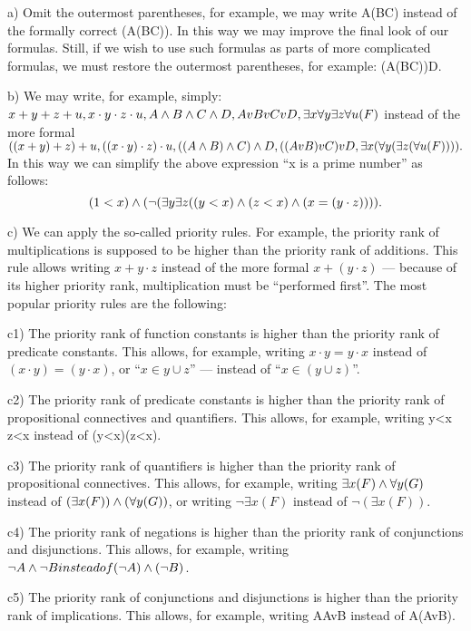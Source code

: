a) Omit the outermost parentheses, for example, we may write A\IMPLIES (B\IMPLIES C) instead of the formally correct (A\IMPLIES (B\IMPLIES C)). In this way we may improve the final look of our formulas. Still, if we wish to use such formulas as parts of more complicated formulas, we must restore the outermost parentheses, for example: (A\IMPLIES (B\IMPLIES C))\IMPLIES D.

b) We may write, for example, simply: \(x+y+z+u, x\cdot y\cdot z\cdot u, A\wedge B\wedge C\wedge D, AvBvCvD, \exists x\forall y\exists z\forall u(F)\) instead of the more formal \(((x+y)+z)+u, ((x\cdot y)\cdot z)\cdot u, ((A\wedge B)\wedge C)\wedge D, ((AvB)vC)vD, \exists x(\forall y(\exists z(\forall u(F)))).\) In this way we can simplify the above expression ``x is a prime number'' as follows:
\[
(1<x)\wedge (\neg (\exists y\exists z((y<x)\wedge (z<x)\wedge (x=(y\cdot z)))).
\]

c) We can apply the so-called priority rules. For example, the priority rank of multiplications is supposed to be higher than the priority rank of additions. This rule allows writing \(x+y\cdot z\) instead of the more formal \(x+(y\cdot z)\) --- because of its higher priority rank, multiplication must be ``performed first''. The most popular priority rules are the following:

c1) The priority rank of function constants is higher than the priority rank of predicate constants. This allows, for example, writing \(x\cdot y = y\cdot x\) instead of \((x\cdot y)=(y\cdot x)\), or ``\(x\in y\cup z\)'' --- instead of ``\(x\in (y\cup z)\)''.

c2) The priority rank of predicate constants is higher than the priority rank of propositional connectives and quantifiers. This allows, for example, writing y<x \AND  z<x instead of (y<x)\AND (z<x).

c3) The priority rank of quantifiers is higher than the priority rank of propositional connectives. This allows, for example, writing \(\exists x(F)\wedge \forall y(G)\) instead of \((\exists x(F))\wedge (\forall y(G))\), or writing \(\neg \exists x(F)\) instead of \(\neg (\exists x(F))\).

c4) The priority rank of negations is higher than the priority rank of conjunctions and disjunctions. This allows, for example, writing \(\neg A\wedge \neg B instead of (\neg A)\wedge (\neg B)\).

c5) The priority rank of conjunctions and disjunctions is higher than the priority rank of implications. This allows, for example, writing A\IMPLIES AvB instead of A\IMPLIES (AvB).

